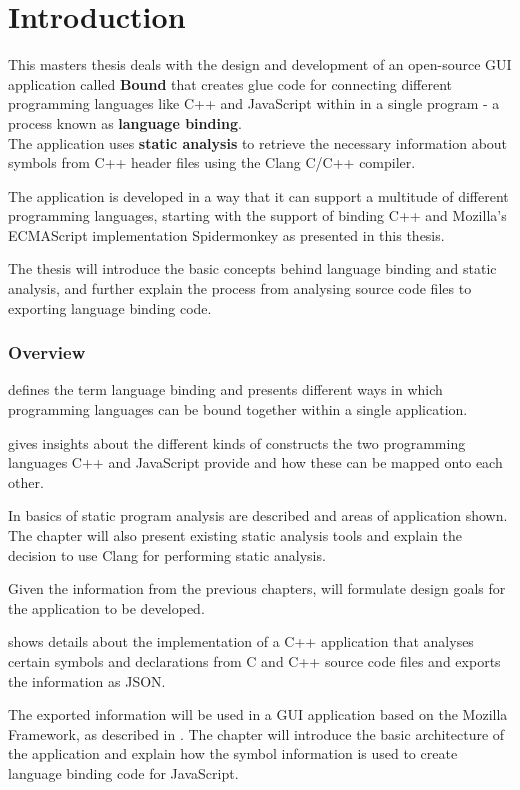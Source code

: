 \chapter{Introduction}

This masters thesis deals with the design and development of an open-source GUI application called \textbf{Bound} that creates glue code for connecting different programming languages like C++ and JavaScript within in a single program - a process known as \textbf{language binding}.\\
The application uses \textbf{static analysis} to retrieve the necessary information about symbols from C++ header files using the Clang C/C++ compiler.

The application is developed in a way that it can support a multitude of different programming languages, starting with the support of binding C++ and Mozilla's ECMAScript implementation Spidermonkey as presented in this thesis.

The thesis will introduce the basic concepts behind language binding and static analysis, and further explain the process from analysing source code files to exporting language binding code.

\subsection{Overview}

 defines the term language binding and presents different ways in which programming languages can be bound together within a single application.

 gives insights about the different kinds of constructs the two programming languages C++ and JavaScript provide and how these can be mapped onto each other.

In  basics of static program analysis are described and areas of application shown. The chapter will also present existing static analysis tools and explain the decision to use Clang for performing static analysis.

Given the information from the previous chapters,  will formulate design goals for the application to be developed.

 shows details about the implementation of a C++ application that analyses certain symbols and declarations from C and C++ source code files and exports the information as JSON.

The exported information will be used in a GUI application based on the Mozilla Framework, as described in . The chapter will introduce the basic architecture of the application and explain how the symbol information is used to create language binding code for JavaScript.



